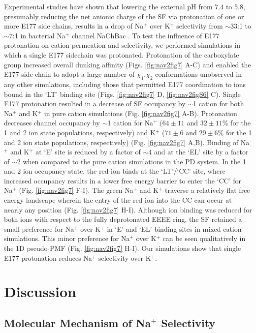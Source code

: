\begin{refsection}
Experimental studies have shown that lowering the external pH from 7.4 to 5.8, presumably reducing the net anionic charge of the SF via protonation of one or more E177 side chains, results in a drop of Na$^+$ over K$^+$ selectivity from $\sim$33:1 to $\sim$7:1 in bacterial Na$^+$ channel NaChBac \cite{FinolUrdaneta:2014bz}. To test the influence of E177 protonation on cation permeation and selectivity, we performed simulations in which a single E177 sidechain was protonated. Protonation of the carboxylate group increased overall dunking affinity (Figs. \ref{fig:nav2fig7} A-C) and enabled the E177 side chain to adopt a large number of $\chi_1$,$\chi_2$ conformations unobserved in any other simulations, including those that permitted E177 coordination to ions bound in the `LT' binding site (Figs. \ref{fig:nav2fig7} D, \ref{fig:nav2figS6} C). Single E177 protonation resulted in a decrease of SF occupancy by $\sim$1 cation for both Na$^+$ and K$^+$ in pure cation simulations (Fig. \ref{fig:nav2fig7} A-B). Protonation decreases channel occupancy by $\sim$1 cation for Na$^+$ ($64\pm11$ and $32\pm11$\% for the 1 and 2 ion state populations, respectively) and K$^+$ ($71\pm6$ and $29\pm6$\% for the 1 and 2 ion state populations, respectively) (Fig. \ref{fig:nav2fig7} A,B). Binding of Na$^+$ and K$^+$ at `E' site is reduced by a factor of $\sim$4 and at the `EL' site by a factor of $\sim$2 when compared to the pure cation simulations in the PD system. In the 1 and 2 ion occupancy state, the red ion binds at the `LT'/`CC' site, where increased occupancy results in a lower free energy barrier to enter the `CC' for Na$^+$ (Fig. \ref{fig:nav2fig7} F-I). The green Na$^+$ and K$^+$ traverse a relatively flat free energy landscape wherein the entry of the red ion into the CC can occur at nearly any position (Fig. \ref{fig:nav2fig7} H-I). 
Although ion binding was reduced for both ions with respect to the fully deprotonated EEEE ring, the SF retained a small preference for Na$^+$ over K$^+$ in `E' and `EL' binding sites in mixed cation simulations. This minor preference for Na$^+$ over K$^+$ can be seen qualitatively in the 1D pseudo-PMF (Fig. \ref{fig:nav2fig7} H-I). Our simulations show that single E177 protonation reduces Na$^+$ selectivity over K$^+$.

\section{Discussion}

\subsection{Molecular Mechanism of Na$^+$ Selectivity}


\end{refsection}
